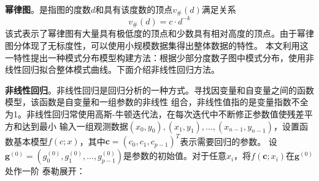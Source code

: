 \documentclass[master]{thesis-uestc}
\begin{document}
    \textbf{幂律图}。是指图的度数$d$和具有该度数的顶点$v_{\#}(d)$满足关系
\begin{equation*}
    v_{\#}(d)=c \cdot d^{-k}
\end{equation*}
该式表示了幂律图有大量具有极低度的顶点和少数具有相对高度的顶点。由于幂律图分体现了无标度性，可以使用小规模数据集得出整体数据的特性。
本文利用这一特性提出一种模式分布模型构建方法：根据少部分度数子图中模式分布，使用非线性回归拟合整体模式曲线。下面介绍非线性回归方法。

    \textbf{非线性回归}。非线性回归是回归分析的一种方式。寻找因变量和自变量之间的函数模型，该函数是自变量和一组参数的非线性
组合，非线性值指的是变量指数不全为1。非线性回归常使用高斯-牛顿迭代法，在每次迭代中不断修正参数值使残差平方和达到最小
输入一组观测数据${(x_0,y_0),(x_1,y_1),\ldots,(x_{n-1},y_{n-1})}$，设置函数基本模型$f(c;x)$，其中$\mathbf{c}=(c_0,c_1,c_{p-1})^T$表示需要回归的参数。
设$\mathbf{g}^{(0)}=\left(g_0^{(0)},g_1^{(0)},\ldots,g_{p-1}^{(0)}\right)$是参数的初始值。对于任意$x_i$，将$f(\mathbf{c};x_i)$在$\mathbf{g}^{(0)}$处作一阶
泰勒展开：
\end{document}
